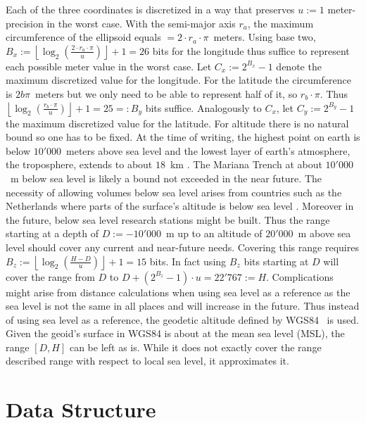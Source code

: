 \documentclass[10pt,conference,compsocconf]{IEEEtran}
\begin{document}
Each of the three coordinates is discretized in a way that preserves $u := 1$ meter-precision in the worst case.
With the semi-major axis $r_a$, the maximum circumference of the ellipsoid equals $=2 \cdot r_a \cdot \pi$~meters.
Using base two, $B_{x}:= \left\lfloor \log_2(\frac{2 \cdot r_a \cdot \pi}{u}) \right\rfloor + 1 = 26$ bits for the longitude thus suffice to represent each possible meter value in the worst case.
Let $C_{x} := 2^{B_{x}} - 1$ denote the maximum discretized value for the longitude.
For the latitude the circumference is $2 b \pi$~meters but we only need to be able to represent half of it, so $r_b \cdot \pi$.
Thus $\left\lfloor\log_2(\frac{r_b \cdot \pi}{u})\right\rfloor + 1 = 25 =: B_{y}$ bits suffice.
Analogously to $C_{x}$, let $C_y := 2^{B_{y}} - 1$ the maximum discretized value for the latitude.
For altitude there is no natural bound so one has to be fixed.
At the time of writing, the highest point on earth is below $10'000$~meters above sea level \cite{us_department_of_commerce_what_nodate} and the lowest layer of earth's atmosphere, the troposphere, extends to about $18$~km \cite{dhaka_chapter_2023}.
The Mariana Trench at about $10'000$~m below sea level \cite{gardner_so_2014} is likely a bound not exceeded in the near future.
The necessity of allowing volumes below sea level arises from countries such as the Netherlands where parts of the surface's altitude is below sea level \cite{kabat_climate_2005} .
Moreover in the future, below sea level research stations might be built.
Thus the range starting at a depth of $D:=-10'000$~m up to an altitude of $20'000$~m above sea level should cover any current and near-future needs.
Covering this range requires $B_{z} := \left\lfloor \log_2(\frac{H - D}{u}) \right\rfloor + 1 = 15$ bits.
In fact using $B_z$ bits starting at $D$ will cover the range from $D$ to $D + (2^{B_{z}} - 1) \cdot u = 22'767 := H$.
Complications might arise from distance calculations when using sea level as a reference as the sea level is not the same in all places and will increase in the future.
Thus instead of using sea level as a reference, the geodetic altitude defined by WGS84~\cite{noauthor_nga_nodate} is used.
Given the geoid's surface in WGS84 is about at the mean sea level (MSL), the range $[D, H]$ can be left as is.
While it does not exactly cover the range described range with respect to local sea level, it approximates it.

\section{Data Structure}
\label{sec:data-structure}
\end{document}
